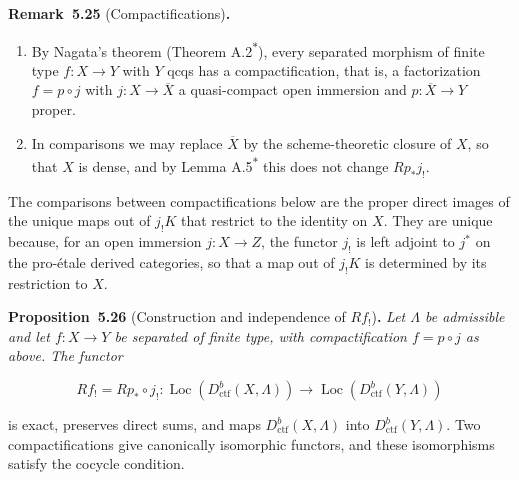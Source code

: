 \documentclass[11pt]{article}
\newenvironment{bpstatement}[2]{\par\addvspace{0.6\baselineskip}\noindent\textbf{#1}#2\textbf{.}\enspace\ignorespaces}
  {\par\addvspace{0.4\baselineskip}}
\newenvironment{bpstatementit}[2]{\begin{bpstatement}{#1}{#2}\itshape\ignorespaces}{\end{bpstatement}}
\newcommand{\bpout}[1]{#1\textsuperscript{\hyperlink{bp-outside}{\ensuremath{\ast}}}}
\providecommand{\Loc}{}\renewcommand{\Loc}{\operatorname{Loc}}
\begin{document}
\label{bp84}%
\begin{bpstatement}{Remark~5.25}{ (Compactifications)}
\begin{enumerate}
\item By Nagata's theorem (Theorem \bpout{A.2}), every separated morphism of finite type \(f:X\to Y\) with \(Y\) qcqs has a compactification, that is, a factorization \(f=p\circ j\) with \(j:X\to\overline X\) a quasi-compact open immersion and \(p:\overline X\to Y\) proper.
\item In comparisons we may replace \(\overline X\) by the scheme-theoretic closure of \(X\), so that \(X\) is dense, and by Lemma \bpout{A.5} this does not change \(Rp_*j_!\).
\end{enumerate}
\end{bpstatement}

\label{bp85}%
The comparisons between compactifications below are the proper direct images of the unique maps out of \(j_!K\) that restrict to the identity on \(X\). They are unique because, for an open immersion \(j:X\to Z\), the functor \(j_!\) is left adjoint to \(j^*\) on the pro-étale derived categories, so that a map out of \(j_!K\) is determined by its restriction to \(X\).

\label{bp86}%
\begin{bpstatementit}{Proposition~5.26}{ (Construction and independence of $Rf_!$)}
Let \(\Lambda\) be admissible and let \(f:X\to Y\) be separated of finite type, with compactification \(f=p\circ j\) as above. The functor

\[
Rf_!=Rp_*\circ j_!:\Loc(D^b_{\mathrm{ctf}}(X,\Lambda))\to\Loc(D^b_{\mathrm{ctf}}(Y,\Lambda))
\]

is exact, preserves direct sums, and maps \(D^b_{\mathrm{ctf}}(X,\Lambda)\) into \(D^b_{\mathrm{ctf}}(Y,\Lambda)\). Two compactifications give canonically isomorphic functors, and these isomorphisms satisfy the cocycle condition.
\end{bpstatementit}
\end{document}
